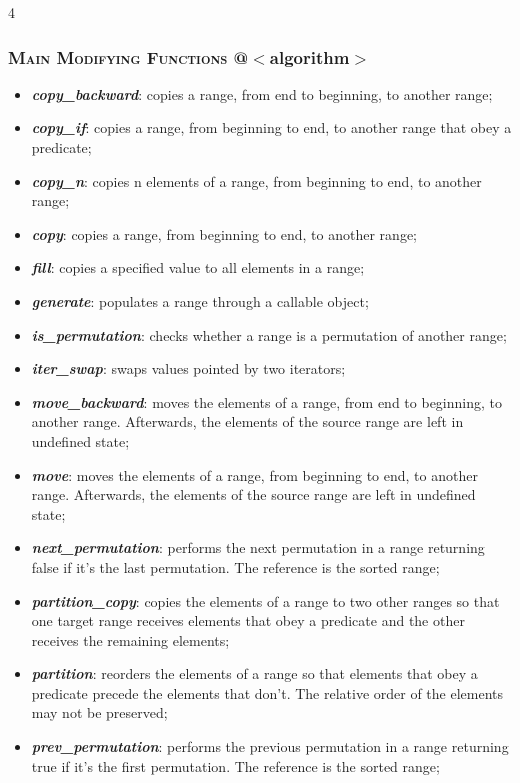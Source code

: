 \documentclass[10pt]{article}
\begin{document}
\begin{multicols*}{4}
{\subsubsection*{\textsc{Main Modifying Functions} @$<$algorithm$>$} 
\begin{itemize}[leftmargin=*,topsep=0.25pt]
  \setlength\itemsep{-1.8pt}
	\item  \emph{\textbf{copy\_backward}}: copies a range, from end to beginning, to another range;
	\item  \emph{\textbf{copy\_if}}: copies a range, from beginning to end, to another range that obey a predicate;
	\item  \emph{\textbf{copy\_n}}: copies n elements of a range, from beginning to end, to another range;
	\item  \emph{\textbf{copy}}: copies a range, from beginning to end, to another range;
	\item  \emph{\textbf{fill}}: copies a specified value to all elements in a range;
	\item  \emph{\textbf{generate}}: populates a range through a callable object;
	\item  \emph{\textbf{is\_permutation}}: checks whether a range is a permutation of another range;
	\item  \emph{\textbf{iter\_swap}}: swaps values pointed by two iterators;
	\item  \emph{\textbf{move\_backward}}: moves the elements of a range, from end to beginning, to another range. Afterwards, the elements of the source range are left in undefined state;
	\item  \emph{\textbf{move}}: moves the elements of a range, from beginning to end, to another range. Afterwards, the elements of the source range are left in undefined state;
	\item  \emph{\textbf{next\_permutation}}: performs the next permutation in a range returning false if it's the last permutation. The reference is the sorted range;
	\item  \emph{\textbf{partition\_copy}}: copies the elements of a range to two other ranges so that one target range receives elements that obey a predicate and the other receives the remaining elements;
	\item  \emph{\textbf{partition}}: reorders the elements of a range so that elements that obey a predicate precede the elements that don't. The relative order of the elements may not be preserved;
	\item  \emph{\textbf{prev\_permutation}}: performs the previous permutation in a range returning true if it's the first permutation. The reference is the sorted range;

\end{itemize}}
\end{multicols*}
\end{document}
